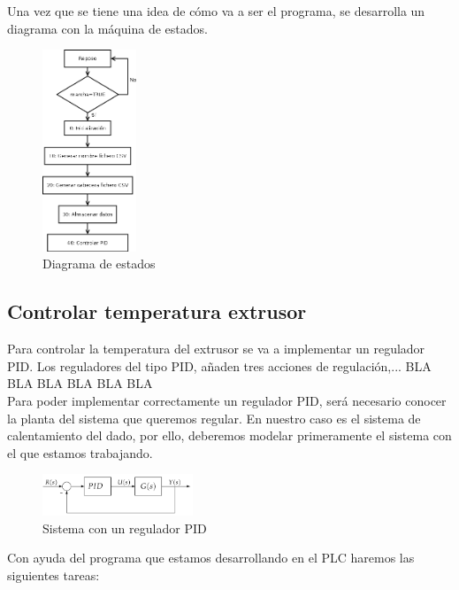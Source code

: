 Una vez que se tiene una idea de cómo va a ser el programa, se desarrolla un diagrama con la máquina de estados.

    \begin{figure}[H]
            \centering
            \includegraphics[width=0.25\textwidth]{images/PLC/diagrama.png}
            \caption{Diagrama de estados}
            \label{fig:plc_estados}
    \end{figure}


\subsection{Controlar temperatura extrusor}
\label{sec:plc_PID}

Para controlar la temperatura del extrusor se va a implementar un regulador PID. Los reguladores del tipo PID, añaden tres acciones de regulación,... BLA BLA BLA BLA BLA BLA\cite{PID}\\


Para poder implementar correctamente un regulador PID, será necesario conocer la planta del sistema que queremos regular. En nuestro caso es el sistema de calentamiento del dado, por ello, deberemos modelar primeramente el sistema con el que estamos trabajando.
    \begin{figure}[H]
            \centering
            \includegraphics[width=0.4\textwidth]{images/PLC/sistema.png}
            \caption{Sistema con un regulador PID}
            \label{fig:plc_sistema}
    \end{figure}

Con ayuda del programa que estamos desarrollando en el PLC haremos las siguientes tareas:

